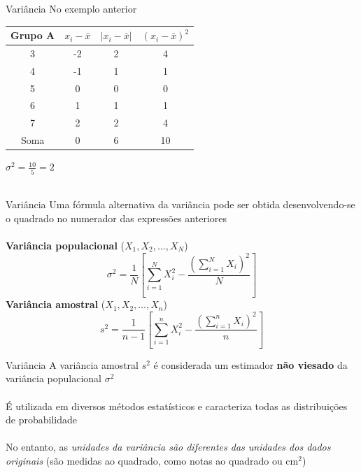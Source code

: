 \documentclass[10pt]{beamer}\usepackage[]{graphicx}\usepackage[]{color}
\theoremstyle{definition}
\begin{document}
\begin{frame}{Variância}
      No exemplo anterior
    \begin{table}[htbp]
    \centering
    \begin{tabular}{cccc}
      \hline
      \textbf{Grupo A} & $x_i - \bar{x}$ & $|x_i - \bar{x}|$ & $(x_i -
      \bar{x})^2$ \\ \hline
      3 & -2 & 2 & 4 \\
      4 & -1 & 1 & 1\\
      5 & 0 & 0 & 0\\
      6 & 1 & 1 & 1\\
      7 & 2 & 2 & 4\\
      \hline
      Soma & 0 & 6 & 10\\
      \hline
    \end{tabular}
  \end{table}
  $\sigma^2 = \frac{10}{5} = 2$ \\~\\
\end{frame}

\begin{frame}{Variância}
  Uma fórmula alternativa da variância pode ser obtida desenvolvendo-se
  o quadrado no numerador das expressões anteriores \\~\\
    \textbf{Variância populacional} ($X_1, X_2, \ldots, X_N$)
  \begin{equation*}
    \sigma^2 = \frac{1}{N} \left[ \sum_{i=1}^{N} X_{i}^{2} -
    \frac{(\sum_{i=1}^{N} X_i)^2}{N} \right]
  \end{equation*}
  \vspace{1em}
    \textbf{Variância amostral} ($X_1, X_2, \ldots, X_n$)
  \begin{equation*}
    s^2 = \frac{1}{n-1} \left[ \sum_{i=1}^{n} X_{i}^{2} -
    \frac{(\sum_{i=1}^{n} X_i)^2}{n} \right]
  \end{equation*}
\end{frame}

\begin{frame}{Variância}
  A variância amostral $s^2$ é considerada um estimador \textbf{não viesado}
  da variância populacional $\sigma^2$ \\~\\
  É utilizada em diversos métodos estatísticos e caracteriza todas as
  distribuições de probabilidade \\~\\
  No entanto, as \textsl{unidades da variância são diferentes das
    unidades dos dados originais} (são medidas ao quadrado, como notas
  ao quadrado ou cm$^2$)
\end{frame}
\end{document}
